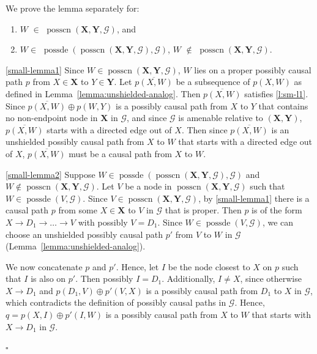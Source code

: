 \documentclass[11pt,a4paper]{article}
\theoremstyle{definition}
\theoremstyle{remark}
\newenvironment{proofof}[1][]{\begin{trivlist}
\item[\hskip \labelsep {\textit{Proof of #1.}}]}{\hfill{}$\square$\end{trivlist}}
\DeclareMathOperator{\possDe}{possde}
\DeclareMathOperator{\possde}{possde}
\DeclareMathOperator{\possCN}{posscn}
\newcommand{\g}[1][G]{\mathcal{#1}}
\newcommand{\posscnb}[2][X,Y]{\possCN(\mathbf{#1},#2)}
\begin{document}
\begin{proofof}[Lemma~\ref{lemma:additional-1}]
	We prove the lemma separately for: 
	
	\begin{enumerate}[label=(\alph*)]
	\item\label{small-lemma1} $W$ $\in$ $\posscnb{\g}$, and  
	
	\item\label{small-lemma2} $W \in$  $\possde(\posscnb{\g},\g)$, $W$ $\notin$ $\posscnb{\g}$.
		\end{enumerate}
	
		\ref{small-lemma1} Since $W \in \posscnb{\g}$, $W$ lies on a proper possibly causal path $p$ from $X \in \mathbf{X}$ to $Y \in \mathbf{Y}$. Let $\overline{p(X,W)}$ be a subsequence of $p(X,W)$ as defined in Lemma~\ref{lemma:unshielded-analog}. Then $\overline{p(X,W)}$ satisfies \ref{l:sm-l1}. 
		Since $\overline{p(X,W)} \oplus p(W,Y)$ is a possibly causal path from $X$ to $Y$ that contains no non-endpoint node in $\mathbf{X}$ in $\g$, and since $\g$ is amenable relative to $(\mathbf{X,Y})$, $\overline{p(X,W)}$ starts with a directed edge out of $X$. Then since $\overline{p(X,W)}$ is an unshielded possibly causal path from $X$ to $W$ that starts with a directed edge out of $X$, $\overline{p(X,W)}$ must be a causal path from $X$ to $W$.
		
		\ref{small-lemma2}  Suppose $W \in \possde(\posscnb{\g},\g)$ and $W \notin \posscnb{\g}$. Let $V$ be a node in $\posscnb{\g}$ such that $W \in \possDe(V,\g)$.
		Since $V \in \posscnb{\g}$, by \ref{small-lemma1} there is a causal path $p$ from some $X \in \mathbf{X}$ to $V$ in $\g$ that is proper. Then $p$ is of the form $X \rightarrow D_1 \rightarrow \dots \rightarrow V $ with possibly $V=D_1$. Since $W \in \possDe(V,\g)$, we can choose an unshielded possibly causal path $p'$ from $V$ to $W$ in $ \g$ (Lemma~\ref{lemma:unshielded-analog}). 
		
		We now concatenate $p$ and $p'$. Hence, let $I$ be the node closest to $X$ on $p$ such that $I$ is also on $p'$.  
		Then possibly $I = D_1$. Additionally, $I \neq X$, { since otherwise $X \rightarrow D_1$ and $p(D_1,V) \oplus p'(V,X)$ is a possibly causal path from $D_1$ to $X$ in $\g$, which contradicts the definition of possibly causal paths in $\g$. } %
		Hence, $q = p(X,I) \oplus p'(I,W)$ is a possibly causal path from $X$ to $W$ that starts with $X \rightarrow D_1$ in $\g$.
		

\end{proofof}
\end{document}
